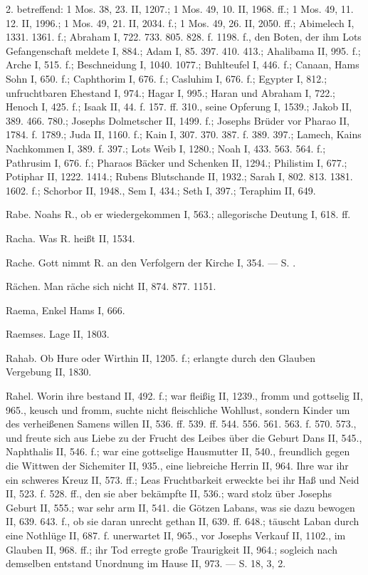 2.  betreffend: 1 Mos. 38, 23. II, 1207.; 1 Mos. 49, 10. II, 1968. ff.; 1 Mos. 49, 11. 12. II, 1996.; 1 Mos. 49, 21. II, 2034. f.; 1 Mos. 49, 26. II, 2050. ff.; Abimelech I, 1331. 1361. f.; Abraham I, 722. 733. 805. 828. f. 1198. f., den Boten, der ihm Lots Gefangenschaft meldete I, 884.; Adam I, 85. 397. 410. 413.; Ahalibama II, 995. f.; Arche I, 515. f.; Beschneidung I, 1040. 1077.; Buhlteufel I, 446. f.; Canaan, Hams Sohn I, 650. f.; Caphthorim I, 676. f.; Casluhim I, 676. f.; Egypter I, 812.; unfruchtbaren Ehestand I, 974.; Hagar I, 995.; Haran und Abraham I, 722.; Henoch I, 425. f.; Isaak II, 44. f. 157. ff. 310., seine Opferung I, 1539.; Jakob II, 389. 466. 780.; Josephs Dolmetscher II, 1499. f.; Josephs Brüder vor Pharao II, 1784. f. 1789.; Juda II, 1160. f.; Kain I, 307. 370. 387. f. 389. 397.; Lamech, Kains Nachkommen I, 389. f. 397.; Lots Weib I, 1280.; Noah I, 433. 563. 564. f.; Pathrusim I, 676. f.; Pharaos Bäcker und Schenken II, 1294.; Philistim I, 677.; Potiphar II, 1222. 1414.; Rubens Blutschande II, 1932.; Sarah I, 802. 813. 1381. 1602. f.; Schorbor II, 1948., Sem I, 434.; Seth I, 397.; Teraphim II, 649.

Rabe. Noahs R., ob er wiedergekommen I, 563.; allegorische Deutung I, 618. ff.

Racha. Was R. heißt II, 1534.

Rache. Gott nimmt R. an den Verfolgern der Kirche I, 354. — S. .

Rächen. Man räche sich nicht II, 874. 877. 1151.

Raema, Enkel Hams I, 666.

Raemses. Lage II, 1803.

Rahab. Ob Hure oder Wirthin II, 1205. f.; erlangte durch den Glauben Vergebung II, 1830.

Rahel. Worin ihre  bestand II, 492. f.; war fleißig II, 1239., fromm und gottselig II, 965., keusch und fromm, suchte nicht fleischliche Wohllust, sondern Kinder um des verheißenen Samens willen II, 536. ff. 539. ff. 544. 556. 561. 563. f. 570. 573., und freute sich aus Liebe zu der Frucht des Leibes über die Geburt
Dans II, 545., Naphthalis II, 546. f.; war eine gottselige Hausmutter II, 540., freundlich gegen die Wittwen der Sichemiter II, 935., eine liebreiche Herrin II, 964. Ihre  war ihr ein schweres Kreuz II, 573. ff.; Leas Fruchtbarkeit erweckte bei ihr Haß und Neid II, 523. f. 528. ff., den sie aber bekämpfte II, 536.; ward stolz über Josephs Geburt II, 555.; war sehr arm II, 541.  die Götzen Labans, was sie dazu bewogen II, 639. 643. f., ob sie daran unrecht gethan II, 639. ff. 648.; täuscht Laban durch eine Nothlüge II, 687. f.  unerwartet II, 965., vor Josephs Verkauf II, 1102., im Glauben II, 968. ff.; ihr Tod erregte große Traurigkeit II, 964.; sogleich nach demselben entstand Unordnung im Hause II, 973. — S.  18,  3,  2.

